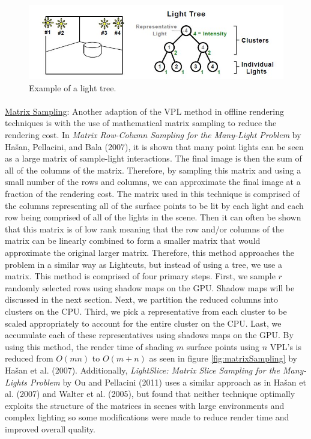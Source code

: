 \begin{figure}[h!]
  \centering
    \includegraphics[width=1.0\textwidth]{lightTree.jpg}
  \caption{Example of a light tree.}
	\label{fig:lightTree}
\end{figure}

\paragraph{}
\underline{Matrix Sampling}: Another adaption of the VPL method in offline rendering techniques is with the use of mathematical matrix sampling to reduce the rendering cost.  In \textit{Matrix Row-Column Sampling for the Many-Light Problem} by Hašan, Pellacini, and Bala (2007), it is shown that many point lights can be seen as a large matrix of sample-light interactions.  The final image is then the sum of all of the columns of the matrix.  Therefore, by sampling this matrix and using a small number of the rows and columns, we can approximate the final image at a fraction of the rendering cost.  The matrix used in this technique is comprised of the columns representing all of the surface points to be lit by each light and each row being comprised of all of the lights in the scene.  Then it can often be shown that this matrix is of low rank meaning that the row and/or columns of the matrix can be linearly combined to form a smaller matrix that would approximate the original larger matrix.  Therefore, this method approaches the problem in a similar way as Lightcuts, but instead of using a tree, we use a matrix.  This method is comprised of four primary steps.  First, we sample $r$ randomly selected rows using shadow maps on the GPU.  Shadow maps will be discussed in the next section.  Next, we partition the reduced columns into clusters on the CPU.  Third, we pick a representative from each cluster to be scaled appropriately to account for the entire cluster on the CPU.  Last, we accumulate each of these representatives using shadows maps on the GPU.  By using this method, the render time of shading $m$ surface points using $n$ VPL's is reduced from $O(mn)$ to $O(m+n)$ as seen in figure \ref{fig:matrixSampling} by Hašan et al. (2007).  Additionally, \textit{LightSlice: Matrix Slice Sampling for the Many-Lights Problem} by Ou and Pellacini (2011) uses a similar approach as in Hašan et al. (2007) and Walter et al. (2005), but found that neither technique optimally exploits the structure of the matrices in scenes with large environments and complex lighting so some modifications were made to reduce render time and improved overall quality.


